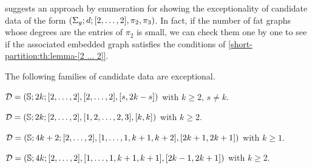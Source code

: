  suggests an approach by enumeration for showing the exceptionality of candidate data of the form $(\Sigma_{g};d;[2,\ldots,2],\pi_2,\pi_3)$. In fact, if the number of fat graphs whose degrees are the entries of $\pi_2$ is small, we can check them one by one to see if the associated embedded graph satisfies the conditions of \cref{short-partition:th:lemma-[2 ... 2]}.

\begin{proposition}\label{short-partition:th:exceptional-sphere}
The following families of candidate data are exceptional.
\begin{enumarabic}
\item $\mathcal{D}=(\mathbb{S}{};2k;[2,\ldots,2],[2,\ldots,2],[s,2k-s])$ with $k\ge 2$, $s\neq k$.
\item $\mathcal{D}=(\mathbb{S}{};2k;[2,\ldots,2],[1,2,\ldots,2,3],[k,k])$ with $k\ge2$.
\item $\mathcal{D}=(\mathbb{S}{};4k+2;[2,\ldots,2],[1,\ldots,1,k+1,k+2],[2k+1,2k+1])$ with $k\ge 1$.
\item $\mathcal{D}=(\mathbb{S}{};4k;[2,\ldots,2],[1,\ldots,1,k+1,k+1],[2k-1,2k+1])$ with $k\ge2$.
\end{enumarabic}
\end{proposition}
